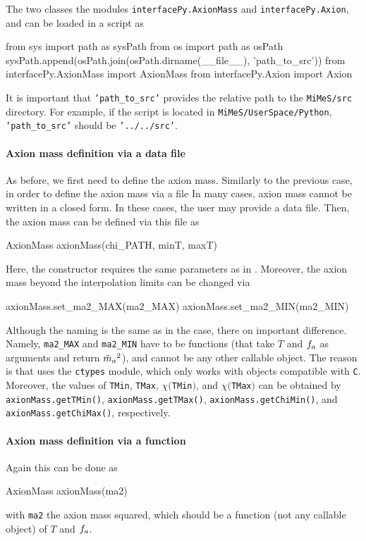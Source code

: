 \documentclass[11pt,a4paper]{article}
\begin{document}
 
 
 
The two classes the modules {\tt interfacePy.AxionMass} and {\tt interfacePy.Axion}, and can be loaded in a \PY script as 
%
\begin{py}
	from sys import path as sysPath
	from os import path as osPath
	sysPath.append(osPath.join(osPath.dirname(__file__), 'path_to_src'))
	from interfacePy.AxionMass import AxionMass
	from interfacePy.Axion import Axion
\end{py}
%
It is important that {\tt 'path\_to\_src'} provides the relative path to the {\tt MiMeS/src} directory. For example, if the script is located in {\tt MiMeS/UserSpace/Python}, {\tt 'path\_to\_src'} should be {\tt '../../src'}.

\paragraph{Axion mass definition via a data file}
As before, we first need to define the axion mass. Similarly to the previous case, in order to define the axion mass via a file
In many cases, axion mass cannot be written in a closed form. In these cases, the user may provide a data file. Then, the axion mass can be defined via this file as
%
\begin{py}
	AxionMass axionMass(chi_PATH, minT, maxT)
\end{py}
%
Here, the constructor requires the same parameters as in \CPP. Moreover, the axion mass beyond the interpolation limits can be changed via
%
\begin{py}
	axionMass.set_ma2_MAX(ma2_MAX)
	axionMass.set_ma2_MIN(ma2_MIN)
\end{py}
%
Although the naming is the same as in the \CPP case, there on important difference. Namely, {\tt ma2\_MAX} and {\tt ma2\_MIN} have to be functions (that take $T$ and $f_{a}{}$ as arguments and return $\tilde m_{a}{}^2$), and cannot be any other callable object. The reason is that \mimes uses the {\tt ctypes} module, which only works with objects compatible with {\tt C}. 
%
Moreover, the values of {\tt TMin}, {\tt TMax}, $\chi(${\tt TMin}$)$, and $\chi(${\tt TMax}$)$ can be obtained by {\tt axionMass.getTMin()}, {\tt axionMass.getTMax()}, {\tt axionMass.getChiMin()}, and {\tt axionMass.getChiMax()}, respectively.

\paragraph{Axion mass definition via a function}
%
Again this can be done as
%
\begin{py}
	AxionMass axionMass(ma2)
\end{py}
%
with {\tt ma2} the axion mass squared, which should be a function (not any callable object) of $T$ and $f_{a}{}$.
\end{document}
